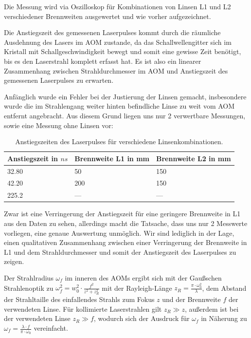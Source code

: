 \documentclass[bigchapter,colorback,accentcolor=tud4b,linedtoc,11pt]{tudreport}
\begin{document}
Die Messung wird via Oszilloskop für Kombinationen von Linsen L1 und L2 verschiedener Brennweiten ausgewertet und wie vorher aufgezeichnet.

Die Anstiegszeit des gemessenen Laserpulses kommt durch die räumliche Ausdehnung des Lasers im AOM zustande, da das Schallwellengitter sich im Kristall mit Schallgeschwindigkeit bewegt und somit eine gewisse Zeit benötigt, bis es den Laserstrahl komplett erfasst hat. Es ist also ein linearer Zusammenhang zwischen Strahldurchmesser im AOM und Anstiegszeit des gemessenen Laserpulses zu erwarten.

Anfänglich wurde ein Fehler bei der Justierung der Linsen gemacht, insbesondere wurde die im Strahlengang weiter hinten befindliche Linse zu weit vom AOM entfernt angebracht. Aus diesem Grund liegen uns nur 2 verwertbare Messungen, sowie eine Messung ohne Linsen vor:

\begin{table}[H]
  \begin{center}
    \begin{tabular}{|p{5cm}|p{4cm}|p{4.5cm}|}
      \hline
          Anstiegszeit in $ns$ & Brennweite L1 in mm & Brennweite L2 in mm \\ \hline
          32.80                & 50                  & 150                 \\ \hline
          42.20                & 200                 & 150                 \\ \hline
          225.2                & ---                 & ---                 \\ \hline
    \end{tabular}
  \end{center}
  \caption{Anstiegszeiten des Laserpulses für verschiedene Linsenkombinationen. }
\end{table}
\FloatBarrier

Zwar ist eine Verringerung der Anstiegszeit für eine geringere Brennweite in L1 aus den Daten zu sehen, allerdings macht die Tatsache, dass uns nur 2 Messwerte vorliegen, eine genaue Auswertung unmöglich. Wir sind lediglich in der Lage, einen qualitativen Zusammenhang zwischen einer Verringerung der Brennweite in L1 und dem Strahldurchmesser und somit der Anstiegszeit des Laserpulses zu zeigen.

Der Strahlradius $\omega_f$ im inneren des AOMs ergibt sich mit der Gaußschen Strahlenoptik zu $\omega_f^2 = w_0^2 \cdot \frac{f^2}{z^2 + z_R^2}$ mit der Rayleigh-Länge $z_R = \frac{\pi \cdot \omega_0^2}{\lambda}$, dem Abstand der Strahltaille des einfallendes Strahls zum Fokus $z$ und der Brennweite $f$ der verwendeten Linse. Für kollimierte Laserstrahlen gilt $z_R \gg z$, außerdem ist bei der verwendeten Linse $z_R \gg f$, wodurch sich der Ausdruck für $\omega_f$ in Näherung zu $\omega_f = \frac{\lambda \cdot f}{\pi \cdot \omega_0}$ vereinfacht.
\end{document}
